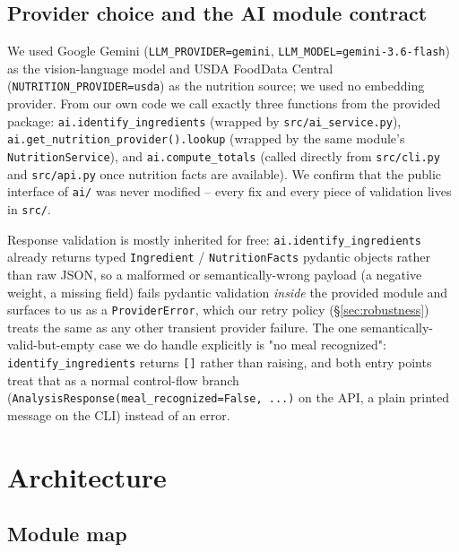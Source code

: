 \documentclass[11pt,a4paper]{article}
\begin{document}
\subsection{Provider choice and the AI module contract}

We used Google Gemini (\texttt{LLM\_PROVIDER=gemini}, \texttt{LLM\_MODEL=gemini-3.6-flash}) as the vision-language model and USDA FoodData Central (\texttt{NUTRITION\_PROVIDER=usda}) as the nutrition source; we used no embedding provider. From our own code we call exactly three functions from the provided package: \texttt{ai.identify\_ingredients} (wrapped by \texttt{src/ai\_service.py}), \texttt{ai.get\_nutrition\_provider()\allowbreak.lookup} (wrapped by the same module's \texttt{NutritionService}), and \texttt{ai.compute\_totals} (called directly from \texttt{src/cli.py} and \texttt{src/api.py} once nutrition facts are available). We confirm that the public interface of \texttt{ai/} was never modified -- every fix and every piece of validation lives in \texttt{src/}.

Response validation is mostly inherited for free: \texttt{ai.identify\_ingredients} already returns typed \texttt{Ingredient} / \texttt{NutritionFacts} pydantic objects rather than raw JSON, so a malformed or semantically-wrong payload (a negative weight, a missing field) fails pydantic validation \emph{inside} the provided module and surfaces to us as a \texttt{ProviderError}, which our retry policy (\S\ref{sec:robustness}) treats the same as any other transient provider failure. The one semantically-valid-but-empty case we do handle explicitly is "no meal recognized": \texttt{identify\_ingredients} returns \texttt{[]} rather than raising, and both entry points treat that as a normal control-flow branch (\texttt{AnalysisResponse(meal\_recognized=False, ...)} on the API, a plain printed message on the CLI) instead of an error.

\section{Architecture}\label{sec:arch}

\subsection{Module map}
\end{document}
